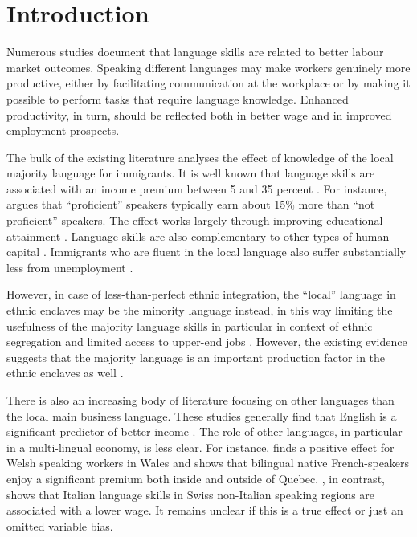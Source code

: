 \documentclass[12pt, a4paper]{article}
\begin{document}
\section{Introduction}
\label{sec:introduction}
Numerous studies document that language skills are related to better
labour market outcomes.
Speaking different languages may make workers genuinely more
productive, either by facilitating communication at the workplace
or by making it possible to perform
tasks that require language knowledge.
Enhanced productivity, in turn, should be reflected both in better wage
and in improved employment prospects.

The bulk of the existing literature analyses the effect of knowledge
of the local majority language for immigrants. It is well known that
language skills are associated with an income premium
between 5 and 35 percent
\citep{Chiswick1995,bleakley+chin2004,shields+price2002,leslie+lindley2001,chiswick+miller2002,Chiswick2010,Chiswick2015, Dustmann2003}. For
instance, \citet{chiswick2008} argues that ``proficient'' speakers
typically earn about 15\% more than ``not proficient'' speakers.
The effect works largely through improving educational attainment
\citep{bleakley+chin2004,rooth+saarela2007native}. Language skills are
also complementary to other types of human capital
\citep{chiswick+miller2007}.
Immigrants who are fluent in the local language also suffer
substantially less from unemployment \citep{shields+price2002, Dustmann2003}.



However, in case of less-than-perfect ethnic integration, the ``local''
language in ethnic enclaves may be the minority language instead, in
this way limiting the usefulness of the majority language skills
\citep{chiswick+miller2002,hwang+2010} in particular in context of ethnic segregation and
limited access to upper-end jobs \citep{Toomet2011}. However, the
existing evidence suggests that the majority language is
an important production factor in the ethnic enclaves as well
\citep{zhou+logan1989, clark+drinkwater2000}.


There is also an increasing body of literature focusing on other languages than the local main business language. These studies generally find
that English is a significant predictor of better income
\citep{Lang2009, Casale2011, Toomet2011, Williams2011, azam+2013EDandCC, isphording2013, fabo+2017E}.
The role of other languages, in particular in a multi-lingual economy, is
less clear. For instance,
\cite{Drinkwater1997} finds
a positive effect for Welsh speaking workers in
Wales and \cite{Armstrong2015} shows that bilingual native French-speakers enjoy
a significant premium both inside and outside of Quebec.
\citet{FrancoisGrin1998}, in contrast,
shows that Italian language skills in Swiss non-Italian speaking
regions are associated with a lower wage. It remains unclear if
this is a true effect or just an omitted variable bias.
\end{document}
